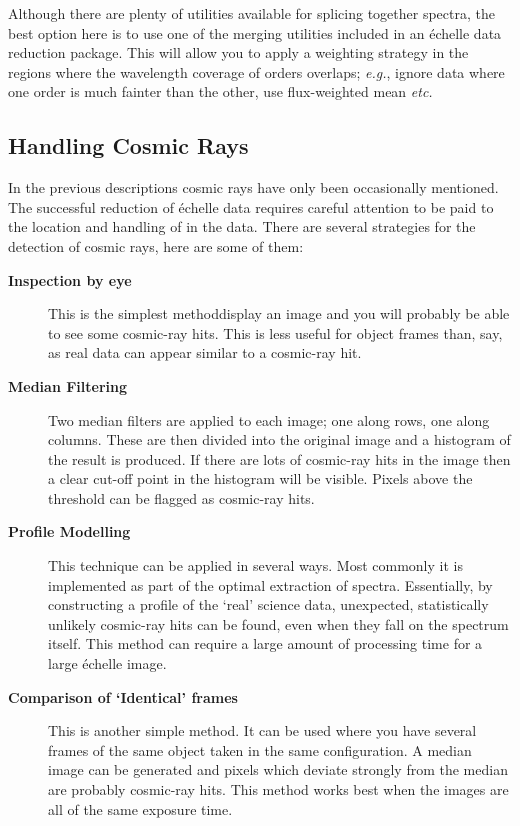 Although there are plenty of utilities available for splicing together
spectra, the best option here is to use one of the merging utilities
included in an \'{e}chelle data reduction package.  This will allow you
to apply a weighting strategy in the regions where the wavelength
coverage of orders overlaps; {\em e.g.}, ignore data where one order is
much fainter than the other, use flux-weighted mean {\em etc.}


\subsection{\label{se_cosmic_rays}Handling Cosmic Rays}

In the previous descriptions cosmic rays have only been occasionally
mentioned.  The successful reduction of \'{e}chelle data requires
careful attention to be paid to the location and handling of
 in the data.
There are several strategies for the detection of cosmic rays, here are
some of them:

\begin{description}

\item [{\bf Inspection by eye}]
      This is the simplest method\sgspec{---}{ - }display an image and you will
      probably be able to see some cosmic-ray hits.  This is less useful
      for object frames than, say, 
      as real data can appear similar to a cosmic-ray hit.

\item [{\bf Median Filtering}]
      Two median filters are applied to each image; one along rows, one
      along columns.  These are then divided into the original image and
      a histogram of the result is produced.  If there are lots of
      cosmic-ray hits in the image then a clear cut-off point in the
      histogram will be visible.  Pixels above the threshold can be
      flagged as cosmic-ray hits.

\item [{\bf Profile Modelling}]
      This technique can be applied in several ways.  Most commonly it
      is implemented as part of the optimal extraction of spectra.
      Essentially, by constructing a profile of the `real' science data,
      unexpected, statistically unlikely
      \sgspec{---}{ - }cosmic-ray hits
      can be found, even when they fall on the spectrum itself.  This
      method can require a large amount of processing time for a large
      \'{e}chelle image.

\item [{\bf Comparison of `Identical' frames}]
      This is another simple method.  It can be used where you have
      several frames of the same object taken in the same configuration.
      A median image can be generated and pixels which deviate strongly
      from the median are probably cosmic-ray hits.  This method works
      best when the images are all of the same exposure time.

\end{description}

